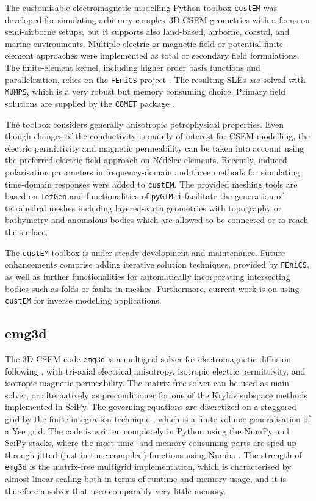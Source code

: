 \documentclass[
    paper,
  ]{geophysics}
\newcommand{\emg}[2]{\texttt{emg#1#2}\xspace}
\newcommand{\custem}{\texttt{custEM}\xspace}
\begin{document}
The customisable electromagnetic modelling Python toolbox \custem was developed for simulating arbitrary complex 3D CSEM geometries with a focus on semi-airborne setups, but it supports also land-based, airborne, coastal, and marine environments. Multiple electric or magnetic field or potential finite-element approaches were implemented as total or secondary field formulations. The finite-element kernel, including higher order basis functions and parallelisation, relies on the \texttt{FEniCS} project \citep{B.SPR.12.Logg, B.SPR.16.Langtangen}. The resulting SLEs are solved with \texttt{MUMPS}, which is a very robust but memory consuming choice. Primary field solutions are supplied by the \texttt{COMET} package \citep{GEO.20.Skibbe}.

The toolbox considers generally anisotropic petrophysical properties. Even though changes of the conductivity is mainly of interest for CSEM modelling, the electric permittivity and magnetic permeability can be taken into account using the preferred electric field approach on Nédélec elements. Recently, induced polarisation parameters in frequency-domain and three methods for simulating time-domain responses were added to \custem. The provided meshing tools are based on \texttt{TetGen} \citep{TOM.15.Si} and functionalities of \texttt{pyGIMLi} facilitate the generation of tetrahedral meshes including layered-earth geometries with topography or bathymetry and anomalous bodies which are allowed to be connected or to reach the surface.

The \custem toolbox is under steady development and maintenance. Future enhancements comprise adding iterative solution techniques, provided by \texttt{FEniCS}, as well as further functionalities for automatically incorporating intersecting bodies such as folds or faults in meshes. Furthermore, current work is on using \custem for inverse modelling applications.


\subsection{emg3d}

The 3D CSEM code \emg3d is a multigrid solver \citep{CMMP.64.Fedorenko} for electromagnetic diffusion following \cite{GP.06.Mulder}, with tri-axial electrical anisotropy, isotropic electric permittivity, and isotropic magnetic permeability. The matrix-free solver can be used as main solver, or alternatively as preconditioner for one of the Krylov subspace methods implemented in SciPy. The governing equations are discretized on a staggered grid by the finite-integration technique \citep{AEU.77.Weiland}, which is a finite-volume generalisation of a Yee grid. The code is written completely in Python using the NumPy and SciPy stacks, where the most time- and memory-consuming parts are sped up through jitted (just-in-time compiled) functions using Numba \citep{LLVM.15.Lam}. The strength of \emg3d is the matrix-free multigrid implementation, which is characterised by almost linear scaling both in terms of runtime and memory usage, and it is therefore a solver that uses comparably very little memory.
\end{document}
